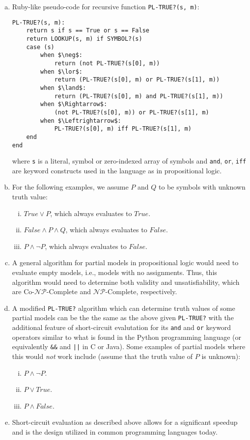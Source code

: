 \documentclass{scrartcl}
\begin{document}
\begin{enumerate}[(a)]
    \item Ruby-like pseudo-code for recursive function \verb|PL-TRUE?(s, m)|:
\begin{lstlisting}
PL-TRUE?(s, m):
    return s if s == True or s == False
    return LOOKUP(s, m) if SYMBOL?(s)
    case (s)
        when $\neg$:
            return (not PL-TRUE?(s[0], m))
        when $\lor$:
            return (PL-TRUE?(s[0], m) or PL-TRUE?(s[1], m))
        when $\land$:
            return (PL-TRUE?(s[0], m) and PL-TRUE?(s[1], m))
        when $\Rightarrow$:
            (not PL-TRUE?(s[0], m)) or PL-TRUE?(s[1], m)
        when $\Leftrightarrow$:
            PL-TRUE?(s[0], m) iff PL-TRUE?(s[1], m)
    end
end
\end{lstlisting}
        where \verb|s| is a literal, symbol or zero-indexed array of symbols and \verb|and|,
        \verb|or|, \verb|iff| are keyword constructs used in the language as in propositional logic.
    \item For the following examples, we assume $P$ and $Q$ to be symbols with unknown truth value:
        \begin{enumerate}[(i)]
            \item $True \lor P$, which always evaluates to $True$.
            \item $False \land P \land Q$, which always evaluates to $False$.
            \item $P \land \neg P$, which always evaluates to $False$.
        \end{enumerate}
    \item A general algorithm for partial models in propositional logic would need to evaluate empty
        models, i.e., models with no assignments. Thus, this algorithm would need to determine both
        validity and unsatisfiability, which are Co-$\mathcal{NP}$-Complete and
        $\mathcal{NP}$-Complete, respectively.
    \item A modified \verb|PL-TRUE?| algorithm which can determine truth values of some partial
        models can be the the same as the above given \verb|PL-TRUE?| with the additional feature of
        short-circuit evalutation for its \verb|and| and \verb|or| keyword operators similar to what
        is found in the Python programming language (or equivalently \verb|&&| and \verb:||: in
        C or Java). Some examples of partial models where this would \emph{not} work include (assume
        that the truth value of $P$ is unknown):
        \begin{enumerate}[(i)]
            \item $P \land \neg P$.
            \item $P \lor True$.
            \item $P \land False$.
        \end{enumerate}
    \item Short-circuit evaluation as described above allows for a significant speedup and is the
        design utilized in common programming languages today.
\end{enumerate}
\end{document}
